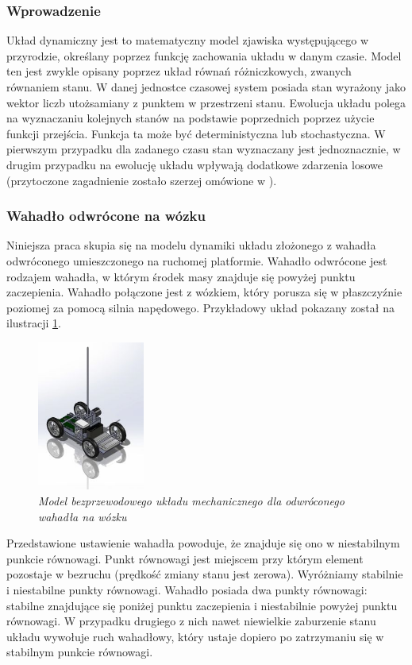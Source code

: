 \documentclass[12pt, oneside]{report}
\theoremstyle{definition}
\begin{document}
\subsubsection{Wprowadzenie}
Układ dynamiczny jest to matematyczny model zjawiska występującego w przyrodzie, określany poprzez funkcję zachowania układu w danym czasie. Model ten jest zwykle opisany poprzez układ równań różniczkowych, zwanych równaniem stanu. W danej jednostce czasowej system posiada stan wyrażony jako wektor liczb utożsamiany z punktem w przestrzeni stanu. Ewolucja układu polega na wyznaczaniu kolejnych stanów na podstawie poprzednich poprzez użycie funkcji przejścia. Funkcja ta może być deterministyczna lub stochastyczna. W pierwszym przypadku dla zadanego czasu stan wyznaczany jest jednoznacznie, w drugim przypadku na ewolucję układu wpływają dodatkowe zdarzenia losowe (przytoczone zagadnienie zostało szerzej omówione w \cite{MarciniakDynamicSystems}).

\subsubsection{Wahadło odwrócone na wózku}
Niniejsza praca skupia się na modelu dynamiki układu złożonego z wahadła odwróconego umieszczonego na ruchomej platformie. Wahadło odwrócone jest rodzajem wahadła, w którym środek masy znajduje się powyżej punktu zaczepienia. Wahadło połączone jest z wózkiem, który porusza się w płaszczyźnie poziomej za pomocą silnia napędowego. Przykładowy układ pokazany został na ilustracji \ref{SystemModelImage}.

\begin{figure}[H]
	\centering
		\includegraphics[width = 100pt]{SystemModel} 
		\caption{\textit{Model bezprzewodowego układu mechanicznego dla odwróconego wahadła na wózku \cite{SystemModel}}}
		\label{SystemModelImage}
\end{figure}

Przedstawione ustawienie wahadła powoduje, że znajduje się ono w niestabilnym punkcie równowagi. Punkt równowagi jest miejscem przy którym element pozostaje w bezruchu (prędkość zmiany stanu jest zerowa). Wyróżniamy stabilnie i niestabilne punkty równowagi. Wahadło posiada dwa punkty równowagi: stabilne znajdujące się poniżej punktu zaczepienia i niestabilnie powyżej punktu równowagi. W przypadku drugiego z nich nawet niewielkie zaburzenie stanu układu wywołuje ruch wahadłowy, który ustaje dopiero po zatrzymaniu się w stabilnym punkcie równowagi. 
\end{document}
